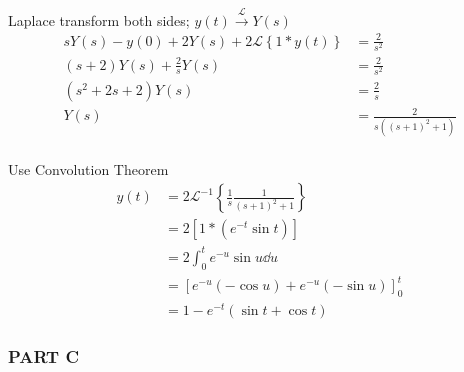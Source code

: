 \documentclass[12pt,final]{novelette} %
\begin{document}
\begin{question}[resume]
    \bigskip
    Laplace transform both sides; $y(t) \xrightarrow{\mathcal{L}} Y(s)$
    \begin{align*}
        s Y(s) - y(0) + 2 Y(s) + 2 \mathcal{L}\left\{1*y(t)\right\} & = \frac2{s^2}          \\
        (s + 2) Y(s) + \frac2{s} Y(s)                               & = \frac2{s^2}          \\
        (s^2 + 2s + 2) Y(s)                                         & = \frac2s              \\
        Y(s)                                                        & = \frac2{s((s+1)^2+1)} \\
    \end{align*}

    \vspace{-2em}

    Use Convolution Theorem
    \begin{align*}
        y(t) & = 2\mathcal{L}^{-1}\left\{\frac1s\frac1{(s+1)^2+1}\right\} \\
             & = 2 \left[1 * (e^{-t} \sin t)\right]                       \\
             & = 2 \int_0^t e^{-u} \sin u \dd{u}                          \\
             & = \left[e^{-u} (-\cos u) + e^{-u} (- \sin u)\right]_0^t    \\
             & = \boxed{1 - e^{-t}(\sin t + \cos t)}
    \end{align*}
\end{question}

\subsubsection*{PART C}
\end{document}
